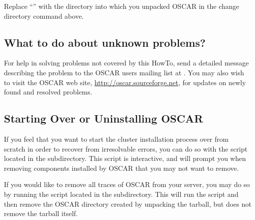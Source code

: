 Replace ``'' with the directory into which you unpacked
\endchange
OSCAR in the change directory command above.

\subsection{What to do about unknown problems?}

For help in solving problems not covered by this HowTo, send a
detailed message describing the problem to the OSCAR users mailing
list at . You may also wish
to visit the OSCAR web site, \url{http://oscar.sourceforge.net}, for
updates on newly found and resolved problems.

\subsection{Starting Over or Uninstalling OSCAR}

If you feel that you want to start the cluster installation process
over from scratch in order to recover from irresolvable errors, you
can do so with the  script located in the
 subdirectory. This script is interactive, and will
prompt you when removing components installed by OSCAR that you may
not want to remove.

If you would like to remove all traces of OSCAR from your server, you
may do so by running the  script located in the
 subdirectory. This will run the 
script and then remove the OSCAR directory created by unpacking the
tarball, but does not remove the tarball itself.



